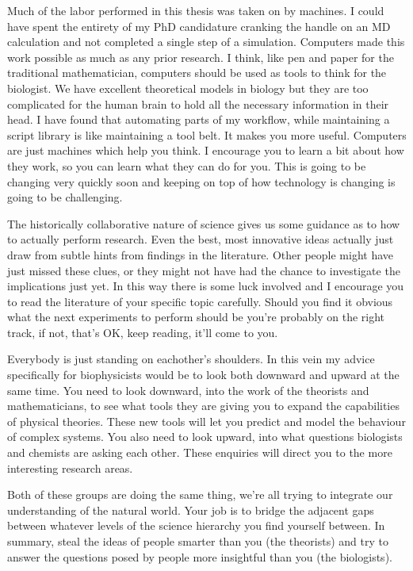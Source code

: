 Much of the labor performed in this thesis was taken on by machines. I could have spent the entirety of my PhD candidature cranking the handle on an MD calculation and not completed a single step of a simulation. Computers made this work possible as much as any prior research. I think, like pen and paper for the traditional mathematician, computers should be used as tools to think for the biologist. We have excellent theoretical models in biology but they are too complicated for the human brain to hold all the necessary information in their head. I have found that automating parts of my workflow, while maintaining a script library is like maintaining a tool belt. It makes you more useful. Computers are just machines which help you think. I encourage you to learn a bit about how they work, so you can learn what they can do for you. This is going to be changing very quickly soon and keeping on top of how technology is changing is going to be challenging. 

The historically collaborative nature of science gives us some guidance as to how to actually perform research. Even the best, most innovative ideas actually just draw from subtle hints from findings in the literature. Other people might have just missed these clues, or they might not have had the chance to investigate the implications just yet. In this way there is some luck involved and I encourage you to read the literature of your specific topic carefully. Should you find it obvious what the next experiments to perform should be you're probably on the right track, if not, that's OK, keep reading, it'll come to you.

Everybody is just standing on eachother's shoulders. In this vein my advice specifically for biophysicists would be to look both downward and upward at the same time. You need to look downward, into the work of the theorists and mathematicians, to see what tools they are giving you to expand the capabilities of physical theories. These new tools will let you predict and model the behaviour of complex systems. You also need to look upward, into what questions biologists and chemists are asking each other. These enquiries will direct you to the more interesting research areas. 

Both of these groups are doing the same thing, we're all trying to integrate our understanding of the natural world. Your job is to bridge the adjacent gaps between whatever levels of the science hierarchy you find yourself between. In summary, steal the ideas of people smarter than you (the theorists) and try to answer the questions posed by people more insightful than you (the biologists). 

